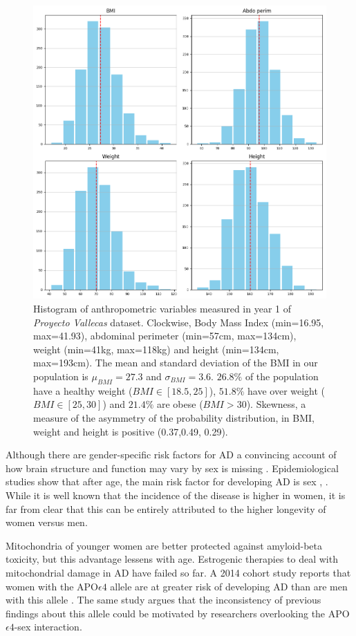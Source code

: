 \documentclass[11pt]{article}
\theoremstyle{definition}
\theoremstyle{remark}
\begin{document}
\begin{figure}[H]
        \centering
        \includegraphics[keepaspectratio, width=.8\linewidth]{figures/Fig_anthro}
        \caption{Histogram of anthropometric variables measured in year 1 of \emph{Proyecto Vallecas} dataset. Clockwise, Body Mass Index (min=16.95, max=41.93), abdominal perimeter (min=57cm, max=134cm), weight (min=41kg, max=118kg) and height (min=134cm, max=193cm). 
        The mean and standard deviation of the BMI in our population is $\mu_{BMI}=27.3$ and $\sigma_{BMI}=3.6$. $26.8\%$ of the population have a healthy weight ($BMI \in [18.5, 25]$), $51.8\%$ have over weight ($BMI \in [25,30]$) and $21.4\%$ are obese ($BMI > 30$). 
        Skewness, a measure of the asymmetry of the probability distribution, in BMI, weight and height is positive (0.37,0.49, 0.29).} 
        \label{fig:anthro}
\end{figure}

Although there are gender-specific risk factors for AD a convincing account of how brain structure and function  may vary by sex is missing \cite{mielke2014clinical}. Epidemiological studies show that after age, the main risk factor for developing AD  is sex \cite{vina2010women}, \cite{mazure2016sex}. While it is well known that the incidence of the disease is higher in women, it is far from clear that this can be entirely attributed to the higher longevity of women versus men. 

Mitochondria of younger women are better protected against amyloid-beta toxicity, but this advantage lessens with age. Estrogenic therapies to deal with mitochondrial damage in AD have failed so far. A 2014 cohort study reports that women with the APO$\epsilon4$ allele are at greater risk of developing AD than are men with this allele \cite{altmann2014sex}. The same study argues that the inconsistency of previous findings about this allele could be motivated by researchers overlooking the APO$\epsilon4$-sex interaction.
\end{document}
